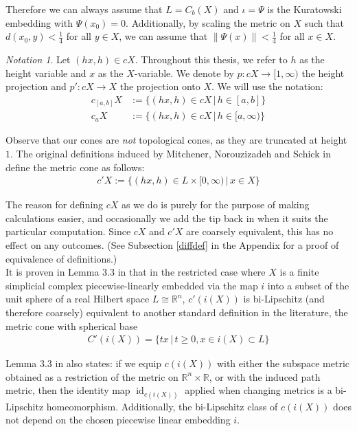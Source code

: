 \documentclass[a4paper,11pt]{article}
\theoremstyle{definition}
\theoremstyle{plain}
\theoremstyle{remark}
\newtheorem*{notation}{Notation}
\DeclareMathOperator{\id}{id}
\begin{document}
Therefore we can always assume that $L = C_{b}(X)$ and $\iota = \Psi$ is the Kuratowski embedding with $\Psi(x_0) = 0$. Additionally, by scaling the metric on $X$ such that $d(x_0,y)<\frac{1}{4}$ for all $y\in X$, we can assume that $\|\Psi(x)\| < \frac{1}{4}$ for all $x\in X$.\\


\begin{notation}
Let $(hx,h)\in cX$. Throughout this thesis, we refer to $h$ as the height variable and $x$ as the $X$-variable. We denote by $p: cX\rightarrow [1,\infty)$ the height projection and $p': cX\rightarrow X$ the projection onto $X$. We will use the notation:
\begin{align*}
c_{[a,b]} X &:=\{(hx,h)\in cX \,|\, h\in [a,b]\}\\
c_{a} X &:=  \{(hx,h)\in cX \,|\, h\in [a,\infty)\}
\end{align*} 
\end{notation}


Observe that our cones are \textit{not} topological cones, as they are truncated at height $1$. The original definitions induced by Mitchener,  Norouzizadeh and Schick in  \cite{mitchener2020coarse} define the metric cone as follows:
\begin{align*}
c'X:= \{(hx,h)\in L \times [0,\infty) \,|\, x\in X\}
\end{align*} 

The reason for defining $cX$ as we do is purely for the purpose of making calculations easier, and occasionally we add the tip back in when it suits the particular computation. Since $cX$ and $c'X$ are coarsely equivalent, this has no effect on any outcomes. (See Subsection \ref{diffdef} in the Appendix for a proof of equivalence of definitions.) \\

It is proven in Lemma $3.3$ in \cite{mitchener2020coarse} that in the restricted case where $X$ is a finite simplicial complex piecewise-linearly embedded via the map $i$ into a subset of the unit sphere of a real Hilbert space $L \cong \mathbb{R}^n$, $c'(i(X))$ is bi-Lipschitz (and therefore coarsely) equivalent to another standard definition in the literature, the metric cone with spherical base
\begin{align*}
C'(i(X)) = \{tx\,|\, t\geq 0, x\in i(X)\subset L\}
\end{align*}

Lemma $3.3$ in \cite{mitchener2020coarse} also states: if we equip $c(i(X))$ with either the subspace metric obtained as a restriction of the metric on $\mathbb{R}^n \times \mathbb{R}$, or with the induced path metric, then the identity map $\id_{c(i(X))}$ applied when changing metrics is a bi-Lipschitz homeomorphism. Additionally, the bi-Lipschitz class of $c(i(X))$ does not depend on the chosen piecewise linear embedding $i$.\\
\end{document}

